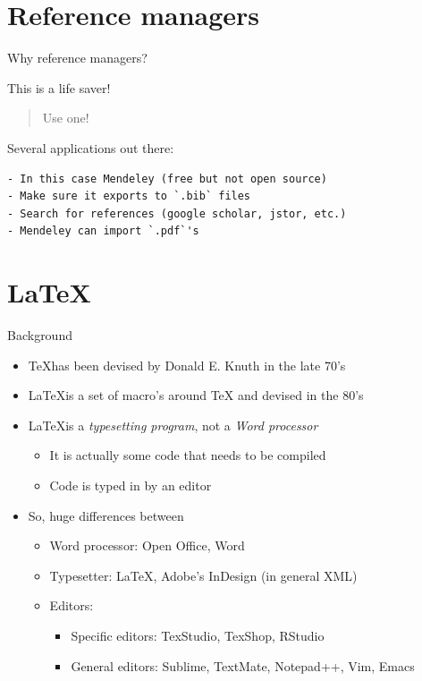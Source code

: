 \documentclass[ignorenonframetext,]{beamer}
\begin{document}
\section{Reference managers}\label{reference-managers}

\begin{frame}[fragile]{Why reference managers?}

This is a life saver!

\begin{quote}
Use one!
\end{quote}

Several applications out there:

\begin{verbatim}
- In this case Mendeley (free but not open source)
- Make sure it exports to `.bib` files
- Search for references (google scholar, jstor, etc.)
- Mendeley can import `.pdf`'s
\end{verbatim}

\end{frame}

\section{\LaTeX}\label{section}

\begin{frame}{Background}

\begin{itemize}
\item
  \TeX has been devised by Donald E. Knuth in the late 70's
\item
  \LaTeX is a set of macro's around TeX and devised in the 80's
\item
  \LaTeX is a \emph{typesetting program}, not a \emph{Word processor}

  \begin{itemize}
  \itemsep1pt\parskip0pt
  \item
    It is actually some code that needs to be compiled
  \item
    Code is typed in by an editor
  \end{itemize}
\item
  So, huge differences between

  \begin{itemize}
  \item
    Word processor: Open Office, Word
  \item
    Typesetter: \LaTeX, Adobe's InDesign (in general XML)
  \item
    Editors:

    \begin{itemize}
    \itemsep1pt\parskip0pt
    \item
      Specific editors: TexStudio, TexShop, RStudio
    \item
      General editors: Sublime, TextMate, Notepad++, Vim, Emacs
    \end{itemize}
  \end{itemize}
\end{itemize}

\end{frame}
\end{document}
